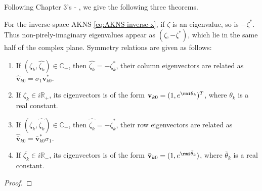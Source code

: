 Following Chapter 3's  - , we give the following three theorems. 
\begin{theorem}
    For the inverse-space AKNS \eqref{eq:AKNS-inverse-x}, if $ \zeta $ is an eigenvalue, so is $ -\zeta^{*} $. Thus non-pirely-imaginary eigenvalues appear as $(\zeta, -\zeta^{*})$, which lie in the same half of the complex plane. Symmetry relations are given as follows:
    \begin{enumerate}
        \item If $ (\zeta_{k}, \hat{\zeta_{k}}) \in \mathbb{C_{+}}$, then $\hat{\zeta_{k}} = - \zeta^{*}_{k} $, their column eigenvectors are related as $\hat{\mathbf{v}}_{k0} = \sigma_{1} \mathbf{v}_{k0}^{*}$.
        \item If $ \zeta_{k} \in i\mathbb{R}_{+} $, its eigenvectors is of the form $\mathbf{v}_{k0} = (1, e^{\rmi\theta_{k}})^{T} $, where $ \theta_{k} $ is a real constant.
        \item If $ (\bar{\zeta_{k}}, \hat{\bar{\zeta_{k}}}) \in \mathbb{C_{-}} $, then $\hat{\bar{\zeta_{k}}} = - \bar{\zeta}^{*}_{k} $, their row eigenvectors are related as $\hat{\bar{\mathbf{v}}}_{k0} = \bar{\mathbf{v}}_{k0}^{*} \sigma_{1}$.
        \item If $ \bar{\zeta_{k}} \in i\mathbb{R}_{-} $, its eigenvectors is of the form $\bar{\mathbf{v}}_{k0} = (1 ,e^{\rmi\bar{\theta}_{k}})$, where $ \bar{\theta}_{k} $ is a real constant.
    \end{enumerate}
\end{theorem}
\begin{proof}
    
\end{proof}

